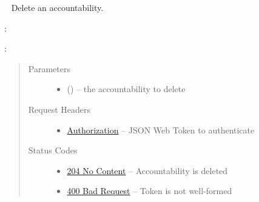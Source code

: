 \documentclass[letterpaper,10pt,english]{sphinxmanual}
\begin{document}
\begin{fulllineitems}
\label{\detokenize{resources/accountability:delete--accountabilities-(accountability_id)}}~
Delete an accountability.

:

\begin{sphinxVerbatim}[commandchars=\\\{\}]
  
 
 
\end{sphinxVerbatim}

:

\begin{sphinxVerbatim}[commandchars=\\\{\}]
  
\end{sphinxVerbatim}
\begin{quote}\begin{description}
\item[{Parameters}] \leavevmode\begin{itemize}
\item {} 
 () -- the accountability to delete

\end{itemize}

\item[{Request Headers}] \leavevmode\begin{itemize}
\item {} 
\href{http://tools.ietf.org/html/rfc7235\#section-4.2}{Authorization} -- JSON Web Token to authenticate

\end{itemize}

\item[{Status Codes}] \leavevmode\begin{itemize}
\item {} 
\href{http://www.w3.org/Protocols/rfc2616/rfc2616-sec10.html\#sec10.2.5}{204 No Content} -- Accountability is deleted

\item {} 
\href{http://www.w3.org/Protocols/rfc2616/rfc2616-sec10.html\#sec10.4.1}{400 Bad Request} -- Token is not well-formed


\end{itemize}
\end{description}
\end{quote}
\end{fulllineitems}
\end{document}
